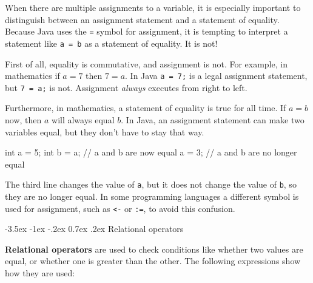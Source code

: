 \documentclass[12pt]{book}
\makeatletter
\theoremstyle{exercise}
\newcommand{\java}[1]{\verb"#1"}
\renewcommand{\section}{\@startsection{section}{1}{\z@}%
    {-3.5ex \@plus -1ex \@minus -.2ex}%
    {0.7ex \@plus.2ex}%
    {\normalfont\Large\bfseries}}
\newcommand{\java}[1]{\lstinline{#1}} %
\makeatother
\begin{document}
%
%

When there are multiple assignments to a variable, it is especially important to distinguish between an assignment statement and a statement of equality.
Because Java uses the \java{=} symbol for assignment, it is tempting to interpret a statement like \java{a = b} as a statement of equality.
It is not!

First of all, equality is commutative, and assignment is not.
For example, in mathematics if $a = 7$ then $7 = a$.
In Java \java{a = 7;} is a legal assignment statement, but \java{7 = a;} is not.
Assignment {\em always} executes from right to left.

Furthermore, in mathematics, a statement of equality is true for all time.
If $a = b$ now, then $a$ will always equal $b$.
In Java, an assignment statement can make two variables equal, but they don't have to stay that way.

\begin{code}
    int a = 5;
    int b = a;     // a and b are now equal
    a = 3;         // a and b are no longer equal
\end{code}

The third line changes the value of \java{a}, but it does not change the value of \java{b}, so they are no longer equal.
In some programming languages a different symbol is used for assignment, such as {\tt <-} or {\tt :=}, to avoid this confusion.



\section{Relational operators}


{\bf Relational operators} are used to check conditions like whether two values are equal, or whether one is greater than the other.
The following expressions show how they are used:
\end{document}
